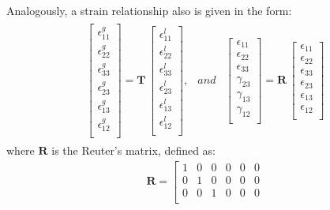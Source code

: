\documentclass[a4paper,12pt]{article}
\begin{document}
{Analogously, a strain relationship also is given in the form:
\begin{eqnarray}
\begin{array}{ccc}
\left [
\begin{array}{c}
\epsilon^g_{11}\\
\epsilon^g_{22}\\ 
\epsilon^g_{33}\\ 
\epsilon^g_{23}\\
\epsilon^g_{13}\\
\epsilon^g_{12}\\
\end{array}
\right ]=
\textbf{T}\,\left [
\begin{array}{c}
\epsilon^l_{11}\\
\epsilon^l_{22}\\ 
\epsilon^l_{33}\\
\epsilon^l_{23}\\
\epsilon^l_{13}\\
\epsilon^l_{12}\\
\end{array}
\right ], & and & \left [
\begin{array}{c}
\epsilon_{11}\\
\epsilon_{22}\\ 
\epsilon_{33}\\ 
\gamma_{23}\\
\gamma_{13}\\
\gamma_{12}\\
\end{array}
\right ]=
\textbf{R}\,\left [
\begin{array}{c}
\epsilon_{11}\\
\epsilon_{22}\\ 
\epsilon_{33}\\
\epsilon_{23}\\
\epsilon_{13}\\
\epsilon_{12}\\
\end{array}
\right ]
\end{array}
\label{eq:strain}
\end{eqnarray}
where \(\textbf{R}\) is the Reuter's matrix, defined as:
\begin{eqnarray}
\textbf{R} = \left [
\begin{array}{cccccc}
1 & 0 & 0 & 0 & 0 & 0\\
0 & 1 & 0 & 0 & 0 & 0\\
0 & 0  & 1 & 0 & 0 & 0\\

\end{array}
\end{eqnarray}}
\end{document}
